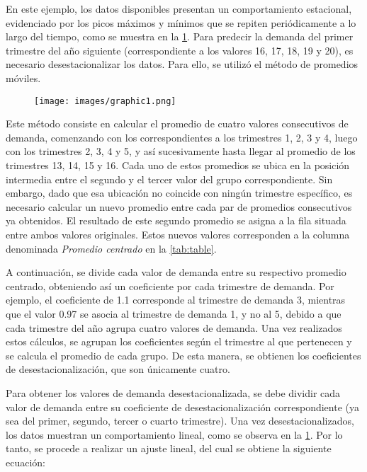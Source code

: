 En este ejemplo, los datos disponibles presentan un comportamiento estacional, 
evidenciado por los picos máximos y mínimos que se repiten periódicamente a lo 
largo del tiempo, como se muestra en la \cref{fig:graphic1}. Para predecir la 
demanda del primer trimestre del año siguiente (correspondiente a los valores 
16, 17, 18, 19 y 20), es necesario desestacionalizar los datos. Para ello, se 
utilizó el método de promedios móviles.

\begin{figure}[H]
    \centering
    \texttt{[image: images/graphic1.png]}
    \label{fig:graphic1}
\end{figure}

Este método consiste en calcular el promedio de cuatro valores consecutivos de 
demanda, comenzando con los correspondientes a los trimestres 1, 2, 3 y 4, 
luego con los trimestres 2, 3, 4 y 5, y así sucesivamente hasta llegar al 
promedio de los trimestres 13, 14, 15 y 16. Cada uno de estos promedios se 
ubica en la posición intermedia entre el segundo y el tercer valor del grupo 
correspondiente. Sin embargo, dado que esa ubicación no coincide con ningún 
trimestre específico, es necesario calcular un nuevo promedio entre cada par de 
promedios consecutivos ya obtenidos. El resultado de este segundo promedio se 
asigna a la fila situada entre ambos valores originales. Estos nuevos valores 
corresponden a la columna denominada \textit{Promedio centrado} en la 
\cref{tab:table}.

A continuación, se divide cada valor de demanda entre su respectivo promedio 
centrado, obteniendo así un coeficiente por cada trimestre de demanda. Por 
ejemplo, el coeficiente de 1.1 corresponde al trimestre de demanda 3, mientras 
que el valor 0.97 se asocia al trimestre de demanda 1, y no al 5, debido a que 
cada trimestre del año agrupa cuatro valores de demanda. Una vez realizados 
estos cálculos, se agrupan los coeficientes según el trimestre al que 
pertenecen y se calcula el promedio de cada grupo. De esta manera, se obtienen 
los coeficientes de desestacionalización, que son únicamente cuatro.

Para obtener los valores de demanda desestacionalizada, se debe dividir cada 
valor de demanda entre su coeficiente de desestacionalización correspondiente 
(ya sea del primer, segundo, tercer o cuarto trimestre). Una vez 
desestacionalizados, los datos muestran un comportamiento lineal, como se 
observa en la \cref{fig:graphic1}. Por lo tanto, se procede a realizar un ajuste 
lineal, del cual se obtiene la siguiente ecuación:

